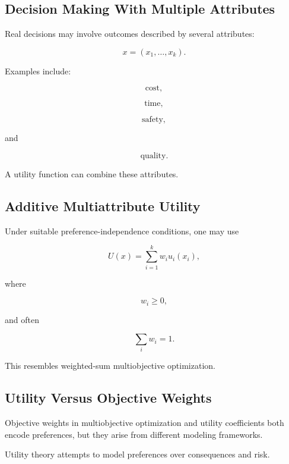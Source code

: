 \subsection{Decision Making With Multiple Attributes}
\label{subsec:multiattribute-decision-making}

Real decisions may involve outcomes described by several attributes:

\[
\boxed{
x
=
(x_1,\ldots,x_k).
}
\]

Examples include:

\[
\boxed{
\text{cost},
}
\]

\[
\boxed{
\text{time},
}
\]

\[
\boxed{
\text{safety},
}
\]

and

\[
\boxed{
\text{quality}.
}
\]

A utility function can combine these attributes.

\subsection{Additive Multiattribute Utility}
\label{subsec:additive-multiattribute-utility}

Under suitable preference-independence conditions, one may use

\[
\boxed{
U(x)
=
\sum_{i=1}^{k}
w_i
u_i(x_i),
}
\]

where

\[
w_i\geq0,
\]

and often

\[
\boxed{
\sum_iw_i=1.
}
\]

This resembles weighted-sum multiobjective optimization.

\subsection{Utility Versus Objective Weights}
\label{subsec:utility-versus-objective-weights}

Objective weights in multiobjective optimization and utility coefficients
both encode preferences, but they arise from different modeling
frameworks.

Utility theory attempts to model preferences over consequences and risk.

